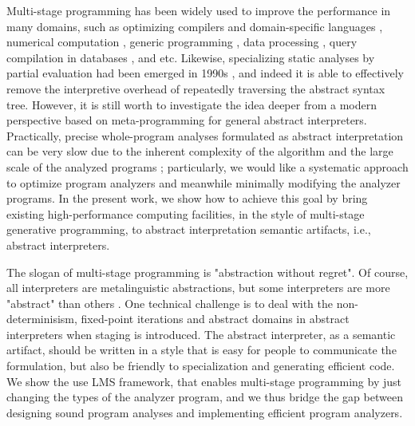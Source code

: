 Multi-stage programming has been widely used to improve the performance in many domains, 
such as optimizing compilers and domain-specific languages \cite{DBLP:conf/pldi/RompfSBLCO14, DBLP:conf/snapl/RompfBLSJAOSKDK15,
DBLP:journals/tecs/SujeethBLRCOO14, DBLP:conf/gpce/SujeethGBLROO13, DBLP:journals/jfp/CaretteKS09},
numerical computation \cite{PGL-038, DBLP:conf/pepm/AktemurKKS13}, 
generic programming \cite{DBLP:journals/pacmpl/Yallop17}, 
data processing \cite{DBLP:conf/oopsla/JonnalageddaCSRO14, DBLP:conf/popl/KiselyovBPS17}, 
query compilation in databases \cite{DBLP:conf/osdi/EssertelTDBOR18, DBLP:conf/sigmod/TahboubER18},
and etc.
Likewise, specializing static analyses by partial evaluation had been emerged in 1990s 
\cite{damian1999partial, amtoft1999partial, Boucher:1996:ACN:647473.727587, ashley:practical}, 
and indeed it is able to effectively remove the interpretive overhead of 
repeatedly traversing the abstract syntax tree. However, it is still worth 
to investigate the idea deeper from a modern perspective based on meta-programming 
for general abstract interpreters.
Practically, precise whole-program analyses formulated as abstract interpretation 
can be very slow due to the inherent complexity of the algorithm and the large scale 
of the analyzed programs \cite{toman_et_al:LIPIcs:2017:7121} ;
particularly, we would like a systematic approach to optimize program 
analyzers and meanwhile minimally modifying the analyzer programs.
In the present work, we show how to achieve this goal by bring existing 
high-performance computing facilities, in the style of multi-stage generative
programming, to abstract interpretation semantic artifacts, i.e., 
abstract interpreters. 

The slogan of multi-stage programming is "abstraction without regret". 
Of course, all interpreters are metalinguistic abstractions, but some interpreters are more "abstract"
than others . 
One technical challenge is to deal with the non-determinisism, fixed-point iterations and abstract 
domains in abstract interpreters when staging is introduced. The abstract interpreter, as a semantic artifact, 
should be written in a style that is easy for people to communicate the formulation, but also be friendly
to specialization and generating efficient code. 
We show the use LMS framework, that enables multi-stage programming by just changing the types 
of the analyzer program, and we thus bridge the gap between designing sound program analyses 
and implementing efficient program analyzers.

